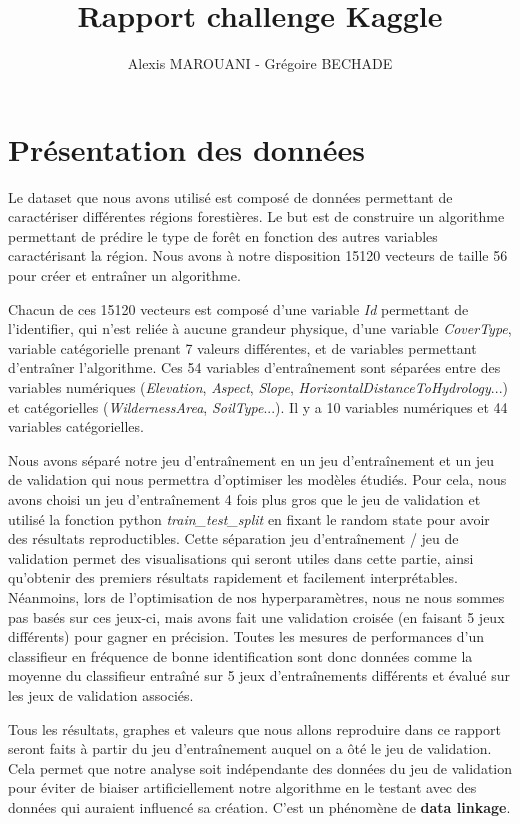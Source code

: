 \documentclass{article}
\title{Rapport challenge Kaggle}
\author{Alexis MAROUANI - Grégoire BECHADE }
\begin{document}
\maketitle

\section{Présentation des données }

Le dataset que nous avons utilisé est composé de données permettant de caractériser différentes régions forestières. Le but est de construire un algorithme permettant de prédire le type de forêt en fonction des autres variables caractérisant la région. Nous avons à notre disposition 15120 vecteurs de taille 56 pour créer et entraîner un algorithme.

Chacun de ces 15120 vecteurs est composé d'une variable \textit{Id} permettant de l'identifier, qui n'est reliée à aucune grandeur physique, d'une variable \textit{CoverType}, variable catégorielle prenant 7 valeurs différentes, et de variables permettant d'entraîner l'algorithme. Ces 54 variables d'entraînement sont séparées entre des variables numériques (\textit{Elevation}, \textit{Aspect}, \textit{Slope}, \textit{HorizontalDistanceToHydrology}...) et catégorielles (\textit{WildernessArea}, \textit{SoilType}...). Il y a 10 variables numériques et 44 variables catégorielles.

Nous avons séparé notre jeu d'entraînement en un jeu d'entraînement et un jeu de validation qui nous permettra d'optimiser les modèles étudiés. Pour cela, nous avons choisi un jeu d'entraînement 4 fois plus gros que le jeu de validation et utilisé la fonction python \textit{train\_test\_split} en fixant le random state pour avoir des résultats reproductibles. Cette séparation jeu d'entraînement / jeu de validation permet des visualisations qui seront utiles dans cette partie, ainsi qu'obtenir des premiers résultats rapidement et facilement interprétables. Néanmoins, lors de l'optimisation de nos hyperparamètres, nous ne nous sommes pas basés sur ces jeux-ci, mais avons fait une validation croisée (en faisant 5 jeux différents) pour gagner en précision. Toutes les mesures de performances d'un classifieur en fréquence de bonne identification sont donc données comme la moyenne du classifieur entraîné sur 5 jeux d'entraînements différents et évalué sur les jeux de validation associés.

Tous les résultats, graphes et valeurs que nous allons reproduire dans ce rapport seront faits à partir du jeu d'entraînement auquel on a ôté le jeu de validation. Cela permet que notre analyse soit indépendante des données du jeu de validation pour éviter de biaiser artificiellement notre algorithme en le testant avec des données qui auraient influencé sa création. C'est un phénomène de \textbf{data linkage}. 
\end{document}
